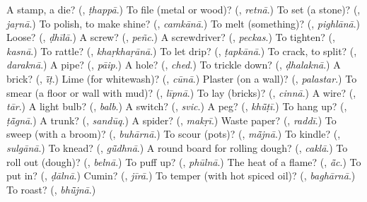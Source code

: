 \begin{tcolorbox}[breakable,colback=teal!4,colframe=teal!35!black,title={Before you move on}]
A stamp, a die? (\textbf{}, \emph{ṭhappā}.) To file (metal or wood)? (\textbf{}, \emph{retnā}.) To set (a stone)? (\textbf{}, \emph{jaṛnā}.) To polish, to make shine? (\textbf{}, \emph{camkānā}.) To melt (something)? (\textbf{}, \emph{pighlānā}.) Loose? (\textbf{}, \emph{ḍhīlā}.) A screw? (\textbf{}, \emph{peñc}.) A screwdriver? (\textbf{}, \emph{peckas}.) To tighten? (\textbf{}, \emph{kasnā}.) To rattle? (\textbf{}, \emph{khaṛkhaṛānā}.) To let drip? (\textbf{}, \emph{ṭapkānā}.) To crack, to split? (\textbf{}, \emph{daraknā}.) A pipe? (\textbf{}, \emph{pāip}.) A hole? (\textbf{}, \emph{ched}.) To trickle down? (\textbf{}, \emph{ḍhalaknā}.) A brick? (\textbf{}, \emph{ī̃ṭ}.) Lime (for whitewash)? (\textbf{}, \emph{cūnā}.) Plaster (on a wall)? (\textbf{}, \emph{palastar}.) To smear (a floor or wall with mud)? (\textbf{}, \emph{līpnā}.) To lay (bricks)? (\textbf{}, \emph{cinnā}.) A wire? (\textbf{}, \emph{tār}.) A light bulb? (\textbf{}, \emph{balb}.) A switch? (\textbf{}, \emph{svic}.) A peg? (\textbf{}, \emph{khū̃ṭī}.) To hang up? (\textbf{}, \emph{ṭā̃gnā}.) A trunk? (\textbf{}, \emph{sandūq}.) A spider? (\textbf{}, \emph{makṛī}.) Waste paper? (\textbf{}, \emph{raddī}.) To sweep (with a broom)? (\textbf{}, \emph{buhārnā}.) To scour (pots)? (\textbf{}, \emph{mā̃jnā}.) To kindle? (\textbf{}, \emph{sulgānā}.) To knead? (\textbf{}, \emph{gū̃dhnā}.) A round board for rolling dough? (\textbf{}, \emph{caklā}.) To roll out (dough)? (\textbf{}, \emph{belnā}.) To puff up? (\textbf{}, \emph{phūlnā}.) The heat of a flame? (\textbf{}, \emph{ā̃c}.) To put in? (\textbf{}, \emph{ḍālnā}.) Cumin? (\textbf{}, \emph{jīrā}.) To temper (with hot spiced oil)? (\textbf{}, \emph{baghārnā}.) To roast? (\textbf{}, \emph{bhū̃jnā}.)
\end{tcolorbox}
